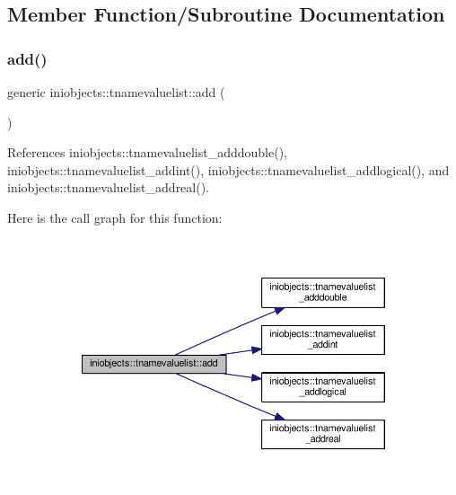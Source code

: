\subsection{Member Function/\+Subroutine Documentation}
\mbox{\label{structiniobjects_1_1tnamevaluelist_a7a8cdd15c953504d85cbc9da0ec49f40}} 
\subsubsection{\texorpdfstring{add()}{add()}}
{\footnotesize\ttfamily generic iniobjects\+::tnamevaluelist\+::add (\begin{DoxyParamCaption}{ }\end{DoxyParamCaption})\hspace{0.3cm}{\ttfamily [private]}}



References iniobjects\+::tnamevaluelist\+\_\+adddouble(), iniobjects\+::tnamevaluelist\+\_\+addint(), iniobjects\+::tnamevaluelist\+\_\+addlogical(), and iniobjects\+::tnamevaluelist\+\_\+addreal().

Here is the call graph for this function\+:
\nopagebreak
\begin{figure}[H]
\begin{center}
\leavevmode
\includegraphics[width=350pt]{structiniobjects_1_1tnamevaluelist_a7a8cdd15c953504d85cbc9da0ec49f40_cgraph}
\end{center}
\end{figure}
\mbox{\label{structiniobjects_1_1tnamevaluelist_a74bdab2d445f52984b729c59527bcab7}} 

